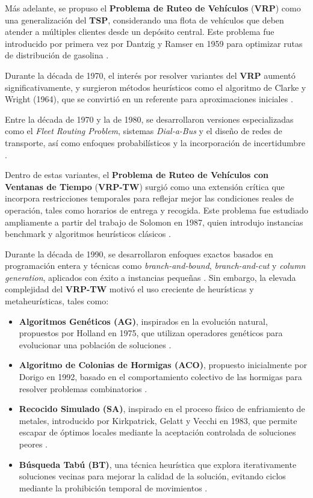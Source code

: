 \documentclass[12pt,titlepage,twoside,openright]{book}
\begin{document}
Más adelante, se propuso el \textbf{Problema de Ruteo de Vehículos} (\textbf{VRP}) como una generalización del \textbf{TSP}, considerando una flota de vehículos que deben atender a múltiples clientes desde un depósito central. Este problema fue introducido por primera vez por Dantzig y Ramser en 1959 para optimizar rutas de distribución de gasolina \citep{dantzig1959truck}.

Durante la década de 1970, el interés por resolver variantes del \textbf{VRP} aumentó significativamente, y surgieron métodos heurísticos como el algoritmo de Clarke y Wright (1964), que se convirtió en un referente para aproximaciones iniciales \citep{clarke1964scheduling}.

Entre la década de 1970 y la de 1980, se desarrollaron versiones especializadas como el \textit{Fleet Routing Problem}, sistemas \textit{Dial-a-Bus} y el diseño de redes de transporte, así como enfoques probabilísticos y la incorporación de incertidumbre \citep{eksioglu2009, golden1988, laporte1992}.

Dentro de estas variantes, el \textbf{Problema de Ruteo de Vehículos con Ventanas de Tiempo} (\textbf{VRP-TW}) surgió como una extensión crítica que incorpora restricciones temporales para reflejar mejor las condiciones reales de operación, tales como horarios de entrega y recogida. Este problema fue estudiado ampliamente a partir del trabajo de Solomon en 1987, quien introdujo instancias benchmark y algoritmos heurísticos clásicos \citep{solomon1987algorithms}.

Durante la década de 1990, se desarrollaron enfoques exactos basados en programación entera y técnicas como \textit{branch-and-bound}, \textit{branch-and-cut} y \textit{column generation}, aplicados con éxito a instancias pequeñas \citep{desrochers1992, cordeau2002}. Sin embargo, la elevada complejidad del \textbf{VRP-TW} motivó el uso creciente de heurísticas y metaheurísticas, tales como:

\begin{itemize}
    \item \textbf{Algoritmos Genéticos (AG)}, inspirados en la evolución natural, propuestos por Holland en 1975, que utilizan operadores genéticos para evolucionar una población de soluciones \citep{holland1975adaptation}.
    \item \textbf{Algoritmo de Colonias de Hormigas (ACO)}, propuesto inicialmente por Dorigo en 1992, basado en el comportamiento colectivo de las hormigas para resolver problemas combinatorios \citep{dorigo1992}.
    \item \textbf{Recocido Simulado (SA)}, inspirado en el proceso físico de enfriamiento de metales, introducido por Kirkpatrick, Gelatt y Vecchi en 1983, que permite escapar de óptimos locales mediante la aceptación controlada de soluciones peores \citep{kirkpatrick1983}.
    \item \textbf{Búsqueda Tabú (BT)}, una técnica heurística que explora iterativamente soluciones vecinas para mejorar la calidad de la solución, evitando ciclos mediante la prohibición temporal de movimientos \citep{aarts1988local}.
\end{itemize}
\end{document}
